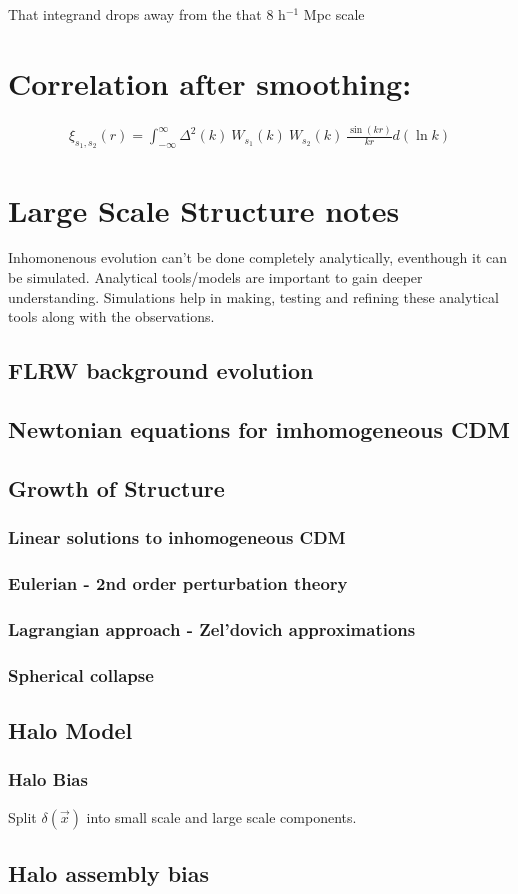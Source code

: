 \documentclass[12pt]{article}
\begin{document}
That integrand drops away from the that 8 h$^{-1}$ Mpc scale

\section{Correlation after smoothing:}

\begin{align}
\xi_{s_1,s_2} (r) = \int_{-\infty}^{\infty} \Delta^2(k) ~W_{s_1}(k) ~W_{s_2}(k) ~\frac{\sin(kr)}{kr} d(\ln k)
\end{align}

\newpage

\section{Large Scale Structure notes}

Inhomonenous evolution can't be done completely analytically, eventhough it can be simulated. Analytical tools/models are important to gain deeper understanding.  Simulations help in making, testing and refining these analytical tools along with the observations.\\

\subsection{FLRW background evolution}

\subsection{Newtonian equations for imhomogeneous CDM}

\subsection{Growth of Structure}

\subsubsection{Linear solutions to inhomogeneous CDM}
\subsubsection{Eulerian - 2nd order perturbation theory}
\subsubsection{Lagrangian approach - Zel'dovich approximations}
\subsubsection{Spherical collapse}

\subsection{Halo Model}
\subsubsection{Halo Bias}
Split $\delta(\vec{x})$ into small scale and large scale components. 

\subsection*{Halo assembly bias}

\newpage
\end{document}
